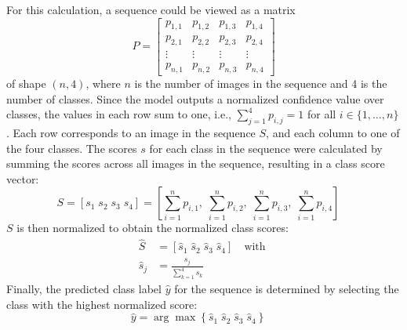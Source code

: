     For this calculation, a sequence could be viewed as a matrix
    \begin{equation}
        P = 
        \begin{bmatrix}
        p_{1,1} & p_{1,2} & p_{1,3} & p_{1,4} \\
        p_{2,1} & p_{2,2} & p_{2,3} & p_{2,4} \\
        \vdots  & \vdots  & \vdots  & \vdots  \\
        p_{n,1} & p_{n,2} & p_{n,3} & p_{n,4}
        \end{bmatrix}
    \label{eq:sequence_matrix}
    \end{equation}
    of shape \((n, 4)\), where \(n\) is the number of images in the sequence and 4 is the number of classes.
    Since the model outputs a normalized confidence value over classes, the values in each row sum to one, i.e., \( \sum_{j=1}^{4} p_{i,j} = 1 \) for all \( i \in \{1, \ldots, n\} \).
    Each row corresponds to an image in the sequence \(S\), and each column to one of the four classes.
    The scores \(s\) for each class in the sequence were calculated by summing the scores across all images in the sequence, resulting in a class score vector:
    \begin{equation}
        S = [s_1\; s_2\; s_3\; s_4] = \left[ \sum_{i=1}^n p_{i,1},\; \sum_{i=1}^n p_{i,2},\; \sum_{i=1}^n p_{i,3},\; \sum_{i=1}^n p_{i,4} \right]\quad
    \label{eq:class_score_vector}
    \end{equation}
    \( S \) is then normalized to obtain the normalized class scores:
    \begin{equation}
    \begin{aligned}
        \hat{S} &= [\hat{s}_1\; \hat{s}_2\; \hat{s}_3\; \hat{s}_4]\quad \text{with } \\
        \hat{s}_j &= \frac{s_j}{\sum_{k=1}^4  s_k}\quad
    \end{aligned}
    \label{eq:normalized_class_scores}
    \end{equation}
    Finally, the predicted class label \( \hat{y} \) for the sequence is determined by selecting the class with the highest normalized score:
    \begin{equation}
        \hat{y} = \arg\max \left\{\hat{s}_1\; \hat{s}_2\; \hat{s}_3\; \hat{s}_4\right\}\quad
    \label{eq:predicted_sequence_label}
    \end{equation}

